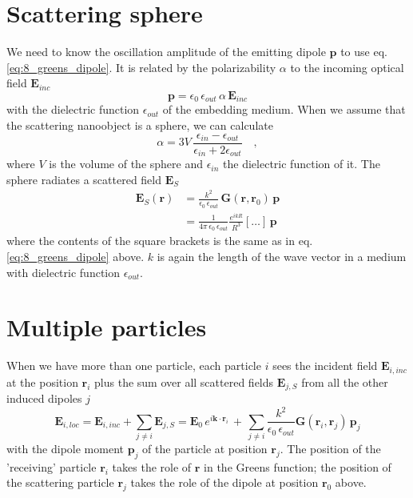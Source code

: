 \section{Scattering sphere}

We need to know the oscillation amplitude of the emitting dipole $\mathbf{p}$ to use eq. \ref{eq:8_greens_dipole}. It is related by the  polarizability $\alpha$  to the incoming optical field $\mathbf{E}_{inc}$
\begin{equation}
\mathbf{p} = \epsilon_0 \, \epsilon_{out} \, \alpha \, \mathbf{E}_{inc}
\end{equation}
with the dielectric function $\epsilon_{out}$ of the embedding medium. 
When we assume that the scattering nanoobject is a sphere, we can calculate
\begin{equation}
 \alpha = 3V \, \frac{\epsilon_{in} - \epsilon_{out}}{\epsilon_{in} + 2 \epsilon_{out}} \quad ,
\end{equation}
where $V$ is the volume of the sphere and  $\epsilon_{in}$ the dielectric function of it. 
The sphere  radiates a scattered field $\mathbf{E}_S$
\begin{align}
\mathbf{E}_S(\mathbf{r}) & =  \frac{k^2}{\epsilon_0 \, \epsilon_{out}} \, \mathbf{G}(\mathbf{r}, \mathbf{r}_0) \,  \mathbf{p} \\
 & =  \frac{1}{4 \pi \, \epsilon_0 \, \epsilon_{out}  }  \frac{e^{i k R} }{  R^3 } 
\left[  \dots \right] \, \mathbf{p}
\end{align}
where the contents of the square brackets is the same as in eq.\ref{eq:8_greens_dipole} above. $k$ is again the length of the wave vector in a medium with dielectric function $\epsilon_{out}$.

\section{Multiple particles}

When we have more than one particle, each particle $i$ sees the incident field $\mathbf{E}_{i, inc}$ at the   position $\mathbf{r}_i$ plus the sum over all scattered fields $\mathbf{E}_{j, S}$ from all the other induced dipoles $j$
\begin{equation}
\mathbf{E}_{i, loc} = \mathbf{E}_{i, inc} + \sum_{j \neq i} \mathbf{E}_{j, S}
 = \mathbf{E}_{0} \, e^{i \mathbf{k} \cdot \mathbf{r}_i} \, +  \, 
 \sum_{j \neq i} \frac{k^2}{\epsilon_0 \, \epsilon_{out}} 
 \mathbf{G}(\mathbf{r}_i, \mathbf{r}_j) \,  \mathbf{p}_j  \label{eq:8_elocal}
\end{equation}
with the dipole moment $ \mathbf{p}_j$ of the particle at position $\mathbf{r}_j$. The position of the 'receiving' particle $\mathbf{r}_i$ takes the role of $\mathbf{r}$ in the Greens function; the position of the scattering particle $\mathbf{r}_j$ takes the role of the dipole at position $\mathbf{r}_0$ above.

